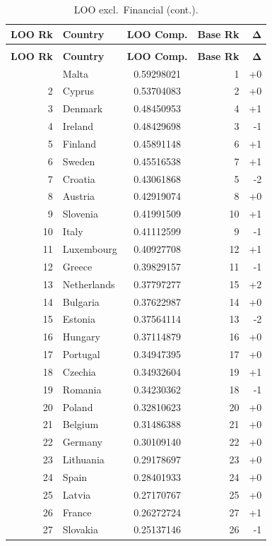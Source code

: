 \begin{longtable}{@{}rl S[table-format=1.8] r r@{}}
\caption{LOO ranking excluding Financial.  Spearman $\rho = 0.992674$, Kendall $\tau = 0.943020$.}
\label{tab:loo-financial}\\
\toprule
{\textbf{LOO Rk}} & {\textbf{Country}} & {\textbf{LOO Comp.}} & {\textbf{Base Rk}} & {$\boldsymbol{\Delta}$} \\
\midrule
\endfirsthead
\caption[]{LOO excl.\ Financial (cont.).}\\
\toprule
{\textbf{LOO Rk}} & {\textbf{Country}} & {\textbf{LOO Comp.}} & {\textbf{Base Rk}} & {$\boldsymbol{\Delta}$} \\
\midrule
\endhead
\bottomrule
{} & Malta & 0.59298021 & 1 & +0 \\
  2 & Cyprus & 0.53704083 & 2 & +0 \\
  3 & Denmark & 0.48450953 & 4 & +1 \\
  4 & Ireland & 0.48429698 & 3 & -1 \\
  5 & Finland & 0.45891148 & 6 & +1 \\
  6 & Sweden & 0.45516538 & 7 & +1 \\
  7 & Croatia & 0.43061868 & 5 & -2 \\
  8 & Austria & 0.42919074 & 8 & +0 \\
  9 & Slovenia & 0.41991509 & 10 & +1 \\
  10 & Italy & 0.41112599 & 9 & -1 \\
  11 & Luxembourg & 0.40927708 & 12 & +1 \\
  12 & Greece & 0.39829157 & 11 & -1 \\
  13 & Netherlands & 0.37797277 & 15 & +2 \\
  14 & Bulgaria & 0.37622987 & 14 & +0 \\
  15 & Estonia & 0.37564114 & 13 & -2 \\
  16 & Hungary & 0.37114879 & 16 & +0 \\
  17 & Portugal & 0.34947395 & 17 & +0 \\
  18 & Czechia & 0.34932604 & 19 & +1 \\
  19 & Romania & 0.34230362 & 18 & -1 \\
  20 & Poland & 0.32810623 & 20 & +0 \\
  21 & Belgium & 0.31486388 & 21 & +0 \\
  22 & Germany & 0.30109140 & 22 & +0 \\
  23 & Lithuania & 0.29178697 & 23 & +0 \\
  24 & Spain & 0.28401933 & 24 & +0 \\
  25 & Latvia & 0.27170767 & 25 & +0 \\
  26 & France & 0.26272724 & 27 & +1 \\
  27 & Slovakia & 0.25137146 & 26 & -1 \\
\end{longtable}
